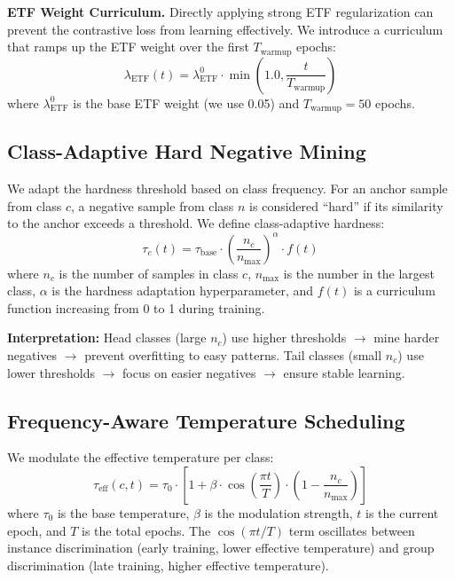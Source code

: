 \documentclass{article}
\begin{document}
\textbf{ETF Weight Curriculum.} Directly applying strong ETF regularization can prevent the contrastive loss from learning effectively. We introduce a curriculum that ramps up the ETF weight over the first $T_{\text{warmup}}$ epochs:
\begin{equation}
\lambda_{\text{ETF}}(t) = \lambda_{\text{ETF}}^0 \cdot \min\left(1.0, \frac{t}{T_{\text{warmup}}}\right)
\end{equation}
where $\lambda_{\text{ETF}}^0$ is the base ETF weight (we use 0.05) and $T_{\text{warmup}} = 50$ epochs.

\subsection{Class-Adaptive Hard Negative Mining}

We adapt the hardness threshold based on class frequency. For an anchor sample from class $c$, a negative sample from class $n$ is considered ``hard'' if its similarity to the anchor exceeds a threshold. We define class-adaptive hardness:
\begin{equation}
\tau_c(t) = \tau_{\text{base}} \cdot \left(\frac{n_c}{n_{\text{max}}}\right)^\alpha \cdot f(t)
\end{equation}
where $n_c$ is the number of samples in class $c$, $n_{\text{max}}$ is the number in the largest class, $\alpha$ is the hardness adaptation hyperparameter, and $f(t)$ is a curriculum function increasing from 0 to 1 during training.

\textbf{Interpretation:} Head classes (large $n_c$) use higher thresholds $\rightarrow$ mine harder negatives $\rightarrow$ prevent overfitting to easy patterns. Tail classes (small $n_c$) use lower thresholds $\rightarrow$ focus on easier negatives $\rightarrow$ ensure stable learning.

\subsection{Frequency-Aware Temperature Scheduling}

We modulate the effective temperature per class:
\begin{equation}
\tau_{\text{eff}}(c, t) = \tau_0 \cdot \left[1 + \beta \cdot \cos\left(\frac{\pi t}{T}\right) \cdot \left(1 - \frac{n_c}{n_{\text{max}}}\right)\right]
\end{equation}
where $\tau_0$ is the base temperature, $\beta$ is the modulation strength, $t$ is the current epoch, and $T$ is the total epochs. The $\cos(\pi t/T)$ term oscillates between instance discrimination (early training, lower effective temperature) and group discrimination (late training, higher effective temperature).
\end{document}
